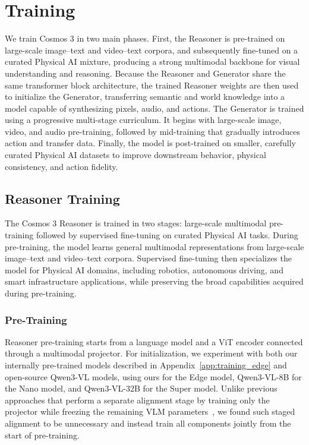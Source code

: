 \section{Training}
\label{sec::training}

We train Cosmos 3 in two main phases. First, the Reasoner is pre-trained on large-scale image--text and video--text corpora, and subsequently fine-tuned on a curated Physical AI mixture, producing a strong multimodal backbone for visual understanding and reasoning. Because the Reasoner and Generator share the same transformer block architecture, the trained Reasoner weights are then used to initialize the Generator, transferring semantic and world knowledge into a model capable of synthesizing pixels, audio, and actions. The Generator is trained using a progressive multi-stage curriculum. It begins with large-scale image, video, and audio pre-training, followed by mid-training that gradually introduces action and transfer data. Finally, the model is post-trained on smaller, carefully curated Physical AI datasets to improve downstream behavior, physical consistency, and action fidelity.


\subsection{Reasoner Training}

The Cosmos 3 Reasoner is trained in two stages: large-scale multimodal pre-training followed by supervised fine-tuning on curated Physical AI tasks. During pre-training, the model learns general multimodal representations from large-scale image--text and video--text corpora. Supervised fine-tuning then specializes the model for Physical AI domains, including robotics, autonomous driving, and smart infrastructure applications, while preserving the broad capabilities acquired during pre-training.

\subsubsection{Pre-Training}

Reasoner pre-training starts from a language model and a ViT encoder connected through a multimodal projector. For initialization, we experiment with both our internally pre-trained models described in Appendix~\ref{app:training_edge} and open-source Qwen3-VL models, using ours for the Edge model, Qwen3-VL-8B for the Nano model, and Qwen3-VL-32B for the Super model. Unlike previous approaches that perform a separate alignment stage by training only the projector while freezing the remaining VLM parameters~\citep{bai2025qwen3}, we found such staged alignment to be unnecessary and instead train all components jointly from the start of pre-training.

